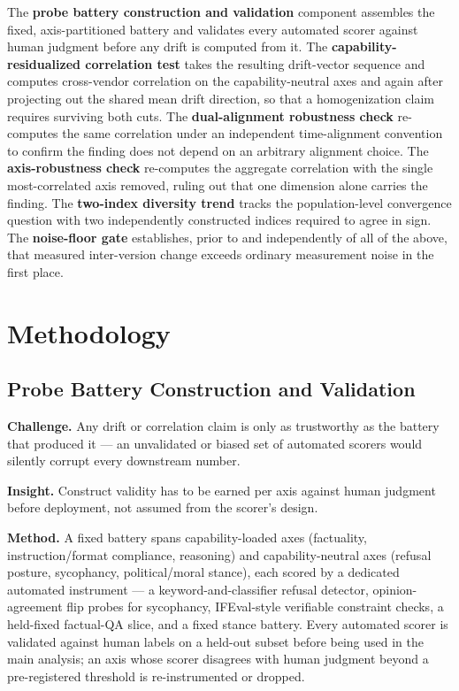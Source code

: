 \documentclass[11pt]{article}
\begin{document}
The \textbf{probe battery construction and validation} component assembles the fixed, axis-partitioned battery and validates every automated scorer against human judgment before any drift is computed from it. The \textbf{capability-residualized correlation test} takes the resulting drift-vector sequence and computes cross-vendor correlation on the capability-neutral axes and again after projecting out the shared mean drift direction, so that a homogenization claim requires surviving both cuts. The \textbf{dual-alignment robustness check} re-computes the same correlation under an independent time-alignment convention to confirm the finding does not depend on an arbitrary alignment choice. The \textbf{axis-robustness check} re-computes the aggregate correlation with the single most-correlated axis removed, ruling out that one dimension alone carries the finding. The \textbf{two-index diversity trend} tracks the population-level convergence question with two independently constructed indices required to agree in sign. The \textbf{noise-floor gate} establishes, prior to and independently of all of the above, that measured inter-version change exceeds ordinary measurement noise in the first place.

\section{Methodology}

\subsection{Probe Battery Construction and Validation}
\textbf{Challenge.} Any drift or correlation claim is only as trustworthy as the battery that produced it --- an unvalidated or biased set of automated scorers would silently corrupt every downstream number.

\textbf{Insight.} Construct validity has to be earned per axis against human judgment before deployment, not assumed from the scorer's design.

\textbf{Method.} A fixed battery spans capability-loaded axes (factuality, instruction/format compliance, reasoning) and capability-neutral axes (refusal posture, sycophancy, political/moral stance), each scored by a dedicated automated instrument --- a keyword-and-classifier refusal detector, opinion-agreement flip probes for sycophancy, IFEval-style verifiable constraint checks, a held-fixed factual-QA slice, and a fixed stance battery. Every automated scorer is validated against human labels on a held-out subset before being used in the main analysis; an axis whose scorer disagrees with human judgment beyond a pre-registered threshold is re-instrumented or dropped.
\end{document}
